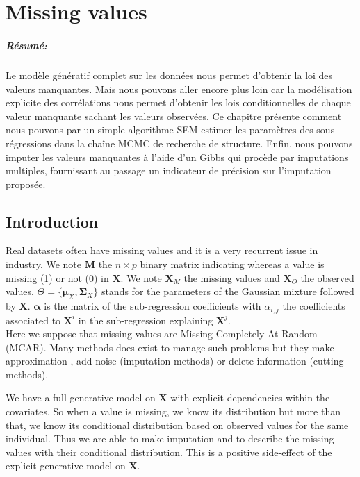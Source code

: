\documentclass[12pt,a4paper]{report}
\begin{document}
\FloatBarrier

\chapter{Missing values}
	\paragraph{Résumé:} Le modèle génératif complet sur les données nous permet d'obtenir la loi des valeurs manquantes. Mais nous pouvons aller encore plus loin car la modélisation explicite des corrélations nous permet d'obtenir les lois conditionnelles de chaque valeur manquante sachant les valeurs observées. Ce chapitre présente comment nous pouvons par un simple algorithme SEM estimer les paramètres des sous-régressions dans la chaîne MCMC de recherche de structure. Enfin, nous pouvons imputer les valeurs manquantes à l'aide d'un Gibbs qui procède par imputations multiples, fournissant au passage un indicateur de précision sur l'imputation proposée. 

\section{Introduction}
	Real datasets often have missing values and it is a very recurrent issue in industry. We note $\boldsymbol{M}$ the $n\times p$ binary matrix indicating whereas a value is missing (1) or not (0) in $\boldsymbol{X}$.
	We note $\boldsymbol{X}_M$ the missing values and $\boldsymbol{X}_{O}$ the observed values. $\Theta=\{\boldsymbol{\mu}_X,\boldsymbol{\Sigma}_X \}$ stands for the parameters of the Gaussian mixture followed by $\boldsymbol{X}$.
	$\boldsymbol{\alpha}$ is the matrix of the sub-regression coefficients with $\alpha_{i,j}$ the coefficients associated to $\boldsymbol{X}^i$ in the sub-regression explaining $\boldsymbol{X}^j$.\\ 
			Here we suppose that missing values are Missing Completely At Random (MCAR). 
	 Many methods does exist to manage such problems \cite{little1992regression} but they make approximation , add noise (imputation methods) or delete information (cutting methods).	
	 
%	 
%	 
	We have a full generative model on $\boldsymbol{X}$ with explicit dependencies within the covariates. So when a value is missing, we know its distribution but more than that, we know its conditional distribution based on observed values for the same individual. Thus we are able to make imputation and to describe the missing values with their conditional distribution. This is a positive side-effect of the explicit generative model on $\boldsymbol{X}$. 
\end{document}
